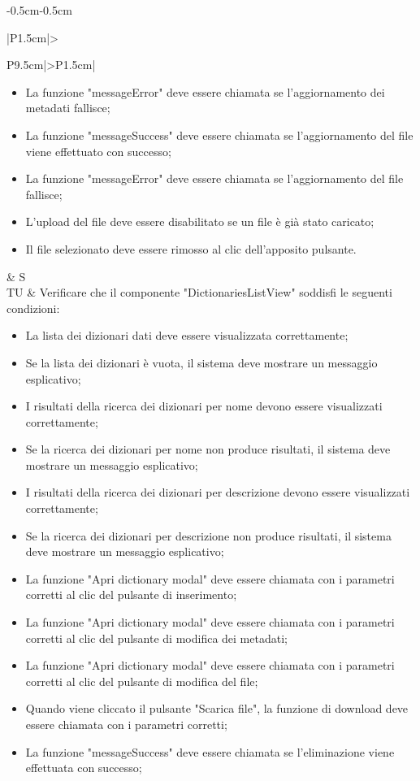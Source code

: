 \begin{adjustwidth}{-0.5cm}{-0.5cm}
\begin{longtable}{|P{1.5cm}|>{\raggedright}P{9.5cm}|>{\arraybackslash}P{1.5cm}|}
\begin{itemize}
			\item La funzione "messageError" deve essere chiamata se l'aggiornamento dei metadati fallisce;
			\item La funzione "messageSuccess" deve essere chiamata se l'aggiornamento del file viene effettuato con successo;
			\item La funzione "messageError" deve essere chiamata se l'aggiornamento del file fallisce;
			\item L'upload del file deve essere disabilitato se un file è già stato caricato;
			\item Il file selezionato deve essere rimosso al clic dell'apposito pulsante.
    \end{itemize} & S \\
		\hline TU & Verificare che il componente "DictionariesListView" soddisfi le seguenti condizioni:
    \begin{itemize}
      \item La lista dei dizionari dati deve essere visualizzata correttamente;
			\item Se la lista dei dizionari è vuota, il sistema deve mostrare un messaggio esplicativo;
			\item I risultati della ricerca dei dizionari per nome devono essere visualizzati correttamente;
			\item Se la ricerca dei dizionari per nome non produce risultati, il sistema deve mostrare un messaggio esplicativo;
			\item I risultati della ricerca dei dizionari per descrizione devono essere visualizzati correttamente;
			\item Se la ricerca dei dizionari per descrizione non produce risultati, il sistema deve mostrare un messaggio esplicativo;
			\item La funzione "Apri dictionary modal" deve essere chiamata con i parametri corretti al clic del pulsante di inserimento;
			\item La funzione "Apri dictionary modal" deve essere chiamata con i parametri corretti al clic del pulsante di modifica dei metadati;
			\item La funzione "Apri dictionary modal" deve essere chiamata con i parametri corretti al clic del pulsante di modifica del file;
			\item Quando viene cliccato il pulsante "Scarica file", la funzione di download deve essere chiamata con i parametri corretti;
			\item La funzione "messageSuccess" deve essere chiamata se l'eliminazione viene effettuata con successo;

\end{itemize}
\end{longtable}
\end{adjustwidth}
